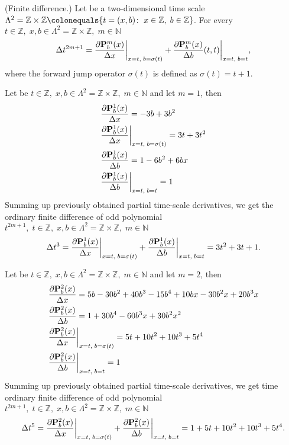 \begin{cor}
    \label{finite_difference_case}
    (Finite difference.)
    Let be a two-dimensional time scale
    $\Lambda^2 = \mathbb{Z} \times \mathbb{Z} \colonequals \{t=(x, b) \colon \; x\in \mathbb{Z}, \; b\in \mathbb{Z} \}$.
    For every $t\in\mathbb{Z}, \; x,b\in \Lambda^2 = \mathbb{Z} \times \mathbb{Z}, \; m\in\mathbb{N}$
    \[
        \Delta t^{2m+1}
        = \frac{\partial {\mathbf{P}}\sp{m} \sb{b}(x)}{\Delta x} \bigg |_{x = t, \; b = \sigma(t)}
        + \frac{\partial {\mathbf{P}}\sp{m} \sb{b}(x)}{\Delta b}(t, t) \bigg |_{x = t, \; b = t},
    \]
    where the forward jump operator $\sigma(t)$ is defined as $\sigma(t) = t+1$.
\end{cor}
\begin{examp}
    \label{time_scale_z_example_1}
    Let be $t\in\mathbb{Z}, \;x,b\in\Lambda^2 = \mathbb{Z} \times \mathbb{Z}, \; m\in\mathbb{N}$ and let $m=1$, then
    \begin{align*}
        &\frac{\partial {\mathbf{P}}\sp{1} \sb{b}(x)}{\Delta x} = -3 b + 3 b^2 \\
        &\frac{\partial {\mathbf{P}}\sp{1} \sb{b}(x)}{\Delta x} \bigg |_{x = t, \; b = \sigma(t)} = 3 t + 3 t^2\\
        &\frac{\partial {\mathbf{P}}\sp{1} \sb{b}(x)}{\Delta b}= 1 - 6 b^2 + 6 b x\\
        &\frac{\partial {\mathbf{P}}\sp{1} \sb{b}(x)}{\Delta b}\bigg |_{x = t, \; b = t}= 1
    \end{align*}
    Summing up previously obtained partial time-scale derivatives, we get the ordinary finite difference of odd polynomial
    $t^{2m+1}, \; t\in\mathbb{Z}, \; x,b\in\Lambda^2 = \mathbb{Z} \times \mathbb{Z}, \; m\in\mathbb{N}$
    \[
        \Delta t^{3}
        = \frac{\partial {\mathbf{P}}\sp{1} \sb{b}(x)}{\Delta x} \bigg |_{x = t, \; b = \sigma(t)}
        + \frac{\partial {\mathbf{P}}\sp{1} \sb{b}(x)}{\Delta b} \bigg |_{x = t, \; b = t}
        = 3 t^2 + 3 t + 1.
    \]
\end{examp}
\begin{examp}
    \label{time_scale_z_example_2}
    Let be $t\in\mathbb{Z}, \;x,b\in\Lambda^2 = \mathbb{Z} \times \mathbb{Z}, \; m\in\mathbb{N}$
    and let $m=2$, then
    \begin{align*}
        &\frac{\partial {\mathbf{P}}\sp{2} \sb{b}(x)}{\Delta x} = 5 b - 30 b^2 + 40 b^3 - 15 b^4 + 10 b x - 30 b^2 x + 20 b^3 x \\
        &\frac{\partial {\mathbf{P}}\sp{2} \sb{b}(x)}{\Delta b} = 1 + 30 b^4 - 60 b^3 x + 30 b^2 x^2 \\
        &\frac{\partial {\mathbf{P}}\sp{2} \sb{b}(x)}{\Delta x} \bigg |_{x = t, \; b = \sigma(t)} = 5 t + 10 t^2 + 10 t^3 + 5 t^4 \\
        &\frac{\partial {\mathbf{P}}\sp{2} \sb{b}(x)}{\Delta b} \bigg |_{x = t, \; b = t} = 1
    \end{align*}
    Summing up previously obtained partial time-scale derivatives, we get time ordinary finite difference of odd polynomial
    $t^{2m+1}, \; t\in\mathbb{Z}, \;x,b\in\Lambda^2 = \mathbb{Z} \times \mathbb{Z}, \; m\in\mathbb{N}$
    \[
        \Delta t^{5}
        = \frac{\partial {\mathbf{P}}\sp{2} \sb{b}(x)}{\Delta x} \bigg |_{x = t, \; b = \sigma(t)}
        + \frac{\partial {\mathbf{P}}\sp{2} \sb{b}(x)}{\Delta b} \bigg |_{x = t, \; b = t}
        = 1 + 5 t + 10 t^2 + 10 t^3 + 5 t^4.
    \]
\end{examp}
